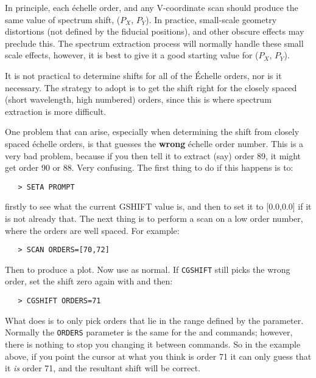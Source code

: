 In principle, each \'{e}chelle order, and any V-coordinate scan should
produce the same value of spectrum shift, ($P_{X}$, $P_{Y}$)\@.  In practice,
small-scale geometry distortions (not defined by the fiducial
positions), and other obscure effects may preclude this.  The spectrum
extraction process will normally handle these small scale effects,
however, it is best to give it a good starting value for ($P_{X}$, $P_{Y}$)\@.

It is not practical to determine shifts for all of the \'{E}chelle orders, nor
is it necessary.  The strategy to adopt is to get the shift right for the
closely spaced (short wavelength, high numbered) orders, since this is where
spectrum extraction is more difficult.

One problem that can arise, especially when determining the shift from closely
spaced \'{e}chelle orders, is that 
 guesses the {\bf wrong}
\'{e}chelle order number.  This is a very bad problem, because if you then
tell it to extract (say) order 89, it might get order 90 or 88.  Very
confusing.  The first thing to do if this happens is to:

\begin{verbatim}
   > SETA PROMPT
\end{verbatim}

firstly to see what the current GSHIFT value is, and then to set it to
[0.0,0.0] if it is not already that.  The next thing is to perform a scan on
a low order number, where the orders are well spaced.  For example:

\begin{verbatim}
   > SCAN ORDERS=[70,72]
\end{verbatim}

Then 
 to produce a plot.  Now use 
 as normal.
If \verb+CGSHIFT+ still picks the wrong order, set the shift zero again with
 and then:

\begin{verbatim}
   > CGSHIFT ORDERS=71
\end{verbatim}

What 
 does is to only pick orders that lie in the range defined
by the 
 parameter.  Normally the \verb+ORDERS+ parameter is the
same for the 
 and 
 commands; however, there is
nothing to stop you changing it between commands.  So in the example above, if
you point the cursor at what you think is order 71 it can only guess that it
{\em is}  order 71, and the resultant shift will be correct.

